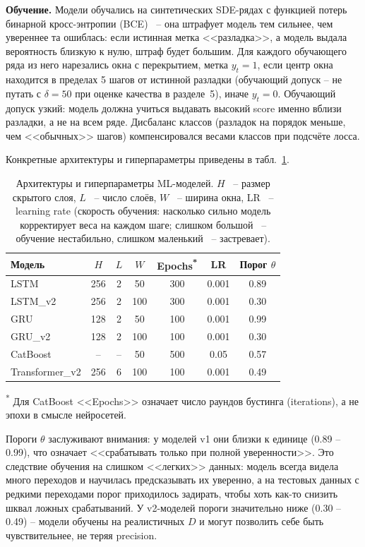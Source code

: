 \documentclass[12pt,a4paper]{article}
\begin{document}
\textbf{Обучение.} Модели обучались на синтетических SDE-рядах с функцией потерь бинарной кросс-энтропии (BCE)~ -- она штрафует модель тем сильнее, чем увереннее та ошиблась: если истинная метка <<разладка>>, а модель выдала вероятность близкую к нулю, штраф будет большим. Для каждого обучающего ряда из него нарезались окна с перекрытием, метка $y_t = 1$, если центр окна находится в пределах 5 шагов от истинной разладки (обучающий допуск -- не путать с $\delta = 50$ при оценке качества в разделе~5), иначе $y_t = 0$. Обучающий допуск узкий: модель должна учиться выдавать высокий score именно вблизи разладки, а не на всем ряде. Дисбаланс классов (разладок на порядок меньше, чем <<обычных>> шагов) компенсировался весами классов при подсчёте лосса.

Конкретные архитектуры и гиперпараметры приведены в табл.~\ref{tab:architectures}.

\begin{table}[ht]
\centering
\caption{Архитектуры и гиперпараметры ML-моделей. $H$~ -- размер скрытого слоя, $L$~ -- число слоёв, $W$~ -- ширина окна, LR~ -- learning rate (скорость обучения: насколько сильно модель корректирует веса на каждом шаге; слишком большой~ -- обучение нестабильно, слишком маленький~ -- застревает).}

\label{tab:architectures}
\begin{tabular}{lcccccc}
\hline
\textbf{Модель} & $H$ & $L$ & $W$ & \textbf{Epochs\textsuperscript{*}} & \textbf{LR} & \textbf{Порог $\theta$} \\
\hline
LSTM           & 256 & 2  & 50  & 300 & 0.001 & 0.89 \\
LSTM\_v2       & 256 & 2  & 100 & 300 & 0.001 & 0.30 \\
GRU            & 128 & 2  & 50  & 100 & 0.001 & 0.99 \\
GRU\_v2        & 128 & 2  & 100 & 100 & 0.001 & 0.30 \\
CatBoost       &  -- &  -- & 50  & 500 & 0.05  & 0.57 \\
Transformer\_v2 & 256 & 6  & 100 & 100 & 0.001 & 0.49 \\
\hline
\end{tabular}

\smallskip
\noindent\textsuperscript{*} Для CatBoost <<Epochs>> означает число раундов бустинга (iterations), а не эпохи в смысле нейросетей.
\end{table}

Пороги $\theta$ заслуживают внимания: у моделей v1 они близки к единице (0.89 -- 0.99), что означает <<срабатывать только при полной уверенности>>. Это следствие обучения на слишком <<легких>> данных: модель всегда видела много переходов и научилась предсказывать их уверенно, а на тестовых данных с редкими переходами порог приходилось задирать, чтобы хоть как-то снизить шквал ложных срабатываний. У v2-моделей пороги значительно ниже (0.30 -- 0.49)  -- модели обучены на реалистичных $D$ и могут позволить себе быть чувствительнее, не теряя precision.
\end{document}

